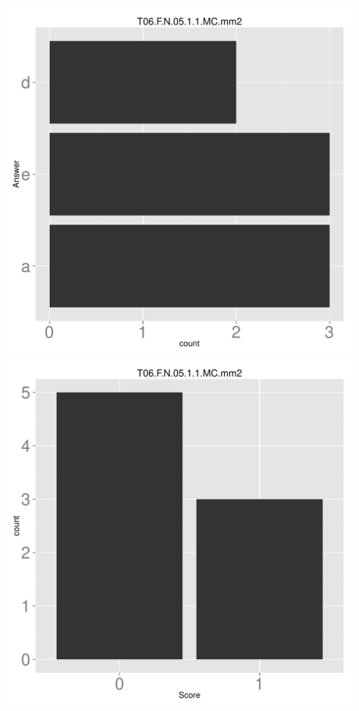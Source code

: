 \documentclass[12pt,english,nohyper]{tufte-handout}\usepackage[]{graphicx}\usepackage[]{color}
\begin{document}
\begin{center} \includegraphics[width=.45\linewidth]{Topic06_AB_50_answer} \includegraphics[width=.45\linewidth]{Topic06_AB_50_score} \end{center} 
\end{document}

